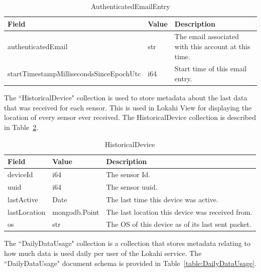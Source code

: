 \begin{table}[H]
	\centering
	\caption{AuthenticatedEmailEntry}
	\begin{tabularx}{\textwidth}{XlX}
		\toprule
		\textbf{Field} & \textbf{Value} & \textbf{Description} \\
		\midrule
		authenticatedEmail & str & The email associated with this account at this time. \\
		startTimestampMillisecondsSinceEpochUtc & i64 & Start time of this email entry. \\
		\bottomrule
	\end{tabularx}
	\label{table:AuthenticatedEmailEntry}
\end{table}

The ``HistoricalDevice" collection is used to store metadata about the last data that was received for each sensor. This is used in Lokahi View for displaying the location of every sensor ever received. The HistoricalDevice collection is described in Table~\ref{table:HistoricalDevice}.

\begin{table}[H]
	\centering
	\caption{HistoricalDevice}
	\begin{tabularx}{\textwidth}{llX}
		\toprule
		\textbf{Field} & \textbf{Value} & \textbf{Description} \\
		\midrule
		deviceId & i64 & The sensor Id. \\
		uuid & i64 & The sensor uuid. \\
		lastActive & Date & The last time this device was active. \\
		lastLocation & mongodb.Point & The last location this device was received from. \\
		os & str & The OS of this device as of its last sent packet. \\
		\bottomrule
	\end{tabularx}
	\label{table:HistoricalDevice}
\end{table}

The ``DailyDataUsage" collection is a collection that stores metadata relating to how much data is used daily per user of the Lokahi service. The ``DailyDataUsage" document schema is provided in Table~\ref{table:DailyDataUsage}.

